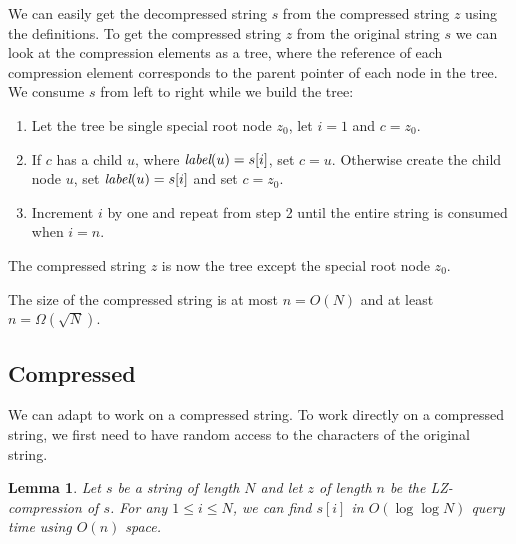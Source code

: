 \documentclass[a4]{article}
\newtheorem{lemma}{Lemma}
\begin{document}
We can easily get the decompressed string $s$ from the compressed string $z$ using the definitions. To get the compressed string $z$ from the original string $s$ we can look at the compression elements as a tree, where the reference of each compression element corresponds to the parent pointer of each node in the tree. We consume $s$ from left to right while we build the tree:
\begin{enumerate}
\item Let the tree be single special root node $z_0$, let $i = 1$ and $c=z_0$.
\item If $c$ has a child $u$, where $\textit{label}(u)=s[i]$, set $c=u$. Otherwise create the child node $u$, set $\textit{label}(u)=s[i]$ and set $c=z_0$.
\item Increment $i$ by one and repeat from step 2 until the entire string is consumed when $i = n$.
\end{enumerate}
The compressed string $z$ is now the tree except the special root node $z_0$.

The size of the compressed string is at most $n=O(N)$ and at least $n=\Omega(\sqrt{N})$.

\subsection{Compressed \label{sec:lz-iterate-forward}}

We can adapt  to work on a compressed string. To work directly on a compressed string, we first need to have random access to the characters of the original string.

\begin{lemma}
\label{lem:lz-random-access}
Let $s$ be a string of length $N$ and let $z$ of length $n$ be the LZ-compression of $s$. For any $1 \leq i \leq N$, we can find $s[i]$ in $O(\log\log N)$ query time using $O(n)$ space.
\end{lemma}
\end{document}
